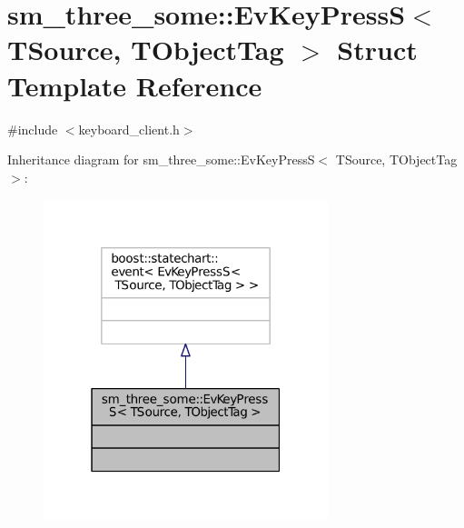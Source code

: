 \hypertarget{structsm__three__some_1_1EvKeyPressS}{}\section{sm\+\_\+three\+\_\+some\+:\+:Ev\+Key\+PressS$<$ T\+Source, T\+Object\+Tag $>$ Struct Template Reference}
\label{structsm__three__some_1_1EvKeyPressS}


{\ttfamily \#include $<$keyboard\+\_\+client.\+h$>$}



Inheritance diagram for sm\+\_\+three\+\_\+some\+:\+:Ev\+Key\+PressS$<$ T\+Source, T\+Object\+Tag $>$\+:
\nopagebreak
\begin{figure}[H]
\begin{center}
\leavevmode
\includegraphics[width=235pt]{structsm__three__some_1_1EvKeyPressS__inherit__graph}
\end{center}
\end{figure}


